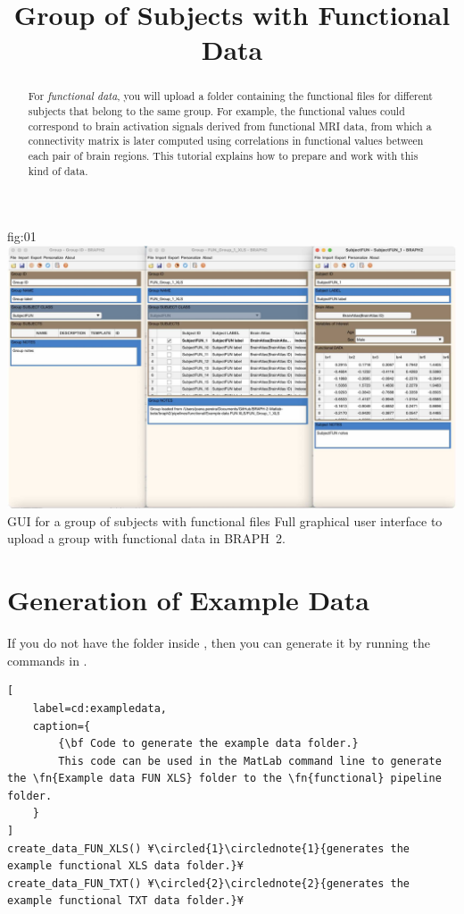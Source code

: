 \documentclass[justified]{tufte-handout}
\title{Group of Subjects with Functional Data}
\begin{document}
\maketitle

\begin{abstract}
\noindent
For \emph{functional data}, you will upload a folder containing the functional files for different subjects that belong to the same group. For example, the functional values could correspond to brain activation signals derived from functional MRI data, from which a connectivity matrix is later computed using correlations in functional values between each pair of brain regions. This tutorial explains how to prepare and work with this kind of data.
\end{abstract}


\tableofcontents

	{fig:01}
	{\includegraphics{fig01.jpg}}
	{GUI for a group of subjects with functional files}
	{
	Full graphical user interface to upload a group with functional data in BRAPH~2. 
	}

\clearpage
\section{Generation of Example Data}

If you do not have the  folder inside , then you can generate it by running the commands in .

\begin{lstlisting}[
	label=cd:exampledata,
	caption={
		{\bf Code to generate the example data folder.}
		This code can be used in the MatLab command line to generate the \fn{Example data FUN XLS} folder to the \fn{functional} pipeline folder.
	}
]
create_data_FUN_XLS() ¥\circled{1}\circlednote{1}{generates the example functional XLS data folder.}¥
create_data_FUN_TXT() ¥\circled{2}\circlednote{2}{generates the example functional TXT data folder.}¥
\end{lstlisting}
\end{document}
